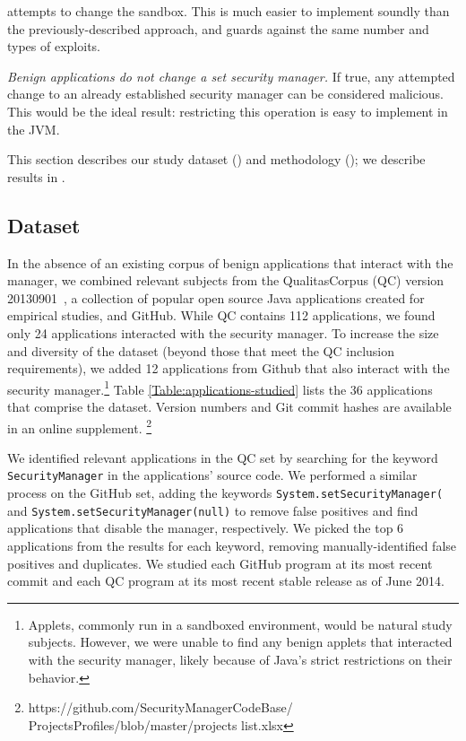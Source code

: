 \documentclass{sig-alternate-05-2015}
\begin{document}
\begin{flushenum}
  attempts to change the sandbox. This is much easier to implement soundly than
  the previously-described approach, and guards against the same number and types of
  exploits.
\item \textit{Benign applications do not change a set security manager.} If
  true, any attempted change to an already established security manager can be
  considered malicious. This would be the ideal result: restricting this
  operation is easy to implement in the JVM.
\end{flushenum}

\noindent This section describes our study dataset () and
methodology (); we describe results in . 

\subsection{Dataset}\label{sec:Applications-Studied}

In the absence of an existing corpus of
benign applications that interact with the manager, %
we combined relevant subjects from 
the QualitasCorpus (QC) version 20130901~\cite{QualitasCorpus:APSEC:2010}, a 
collection of popular open source Java applications created for empirical
studies, and GitHub.
While QC contains 112 applications, we found only 24 applications interacted with 
the security manager.  To increase the size and diversity of the dataset (beyond
those that meet the QC inclusion requirements), we
added 12 applications from Github that also interact with the security manager.\footnote{Applets, commonly
run in a sandboxed environment, would be natural study subjects.  However, we were unable
to find any benign applets that interacted with the security manager, likely
because of Java's strict restrictions on their behavior.}
 Table
\ref{Table:applications-studied} lists the 36 applications that comprise the
dataset.  Version numbers
and Git commit hashes are available in an online supplement.%
\footnote{https://github.com/SecurityManagerCodeBase/\\
ProjectsProfiles/blob/master/projects list.xlsx}

We identified relevant applications in the QC set 
by searching for the keyword \texttt{SecurityManager} in the applications'
source code.  We performed a similar process on
the GitHub set, adding the keywords
\texttt{System.setSecurityManager(} and \texttt{System.setSecurityManager(null)}
to remove false positives and find applications that disable the
manager, respectively. We picked the top 6 applications from the results for each keyword,
removing manually-identified false positives and duplicates. 
We studied each GitHub program at its most
recent commit and each QC program at its most recent stable release as of June 2014.
\end{document}
